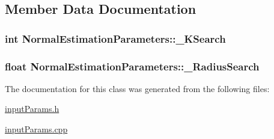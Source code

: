 \subsection{Member Data Documentation}
\hypertarget{classNormalEstimationParameters_a61b3161ffcd3eb6c4531f5dbc223a894}{
\subsubsection[{\-\_\-\-K\-Search}]{\setlength{\rightskip}{0pt plus 5cm}int Normal\-Estimation\-Parameters\-::\-\_\-\-K\-Search\hspace{0.3cm}{\ttfamily [private]}}}\label{classNormalEstimationParameters_a61b3161ffcd3eb6c4531f5dbc223a894}
\hypertarget{classNormalEstimationParameters_a94b744776c5063bba3e4d7af2df102e4}{
\subsubsection[{\-\_\-\-Radius\-Search}]{\setlength{\rightskip}{0pt plus 5cm}float Normal\-Estimation\-Parameters\-::\-\_\-\-Radius\-Search\hspace{0.3cm}{\ttfamily [private]}}}\label{classNormalEstimationParameters_a94b744776c5063bba3e4d7af2df102e4}


The documentation for this class was generated from the following files\-:\begin{DoxyCompactItemize}
\item 
\hyperlink{inputParams_8h}{input\-Params.\-h}\item 
\hyperlink{inputParams_8cpp}{input\-Params.\-cpp}\end{DoxyCompactItemize}
